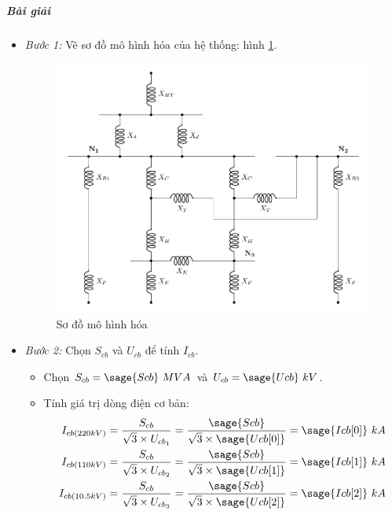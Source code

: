\documentclass[12pt,a4paper]{article}
\newcommand{\unit}[1]{~#1}							%
\begin{document}
\subparagraph{Bài giải}
\begin{itemize}
	\item \textit{Bước 1:} Vẽ sơ đồ mô hình hóa của hệ thống: hình \ref{Fig:sodo-mohinhhoa-bt1}.
		\begin{figure}[!h]
			\begin{center}
				\includegraphics[scale=1]{figure-baitap-nganmach-1-1.pdf} 
			\end{center}
			\caption{Sơ đồ mô hình hóa} \label{Fig:sodo-mohinhhoa-bt1}
		\end{figure}

	\item \textit{Bước 2:} Chọn $S_{cb}$ và $U_{cb}$ để tính $I_{cb}$.	
		\begin{itemize}
			\item Chọn $S_{cb} = \sage{Scb} \unit{MVA}$ và $U_{cb} = \sage{Ucb} \unit{kV}$.
			
			\item Tính giá trị dòng điện cơ bản:
				\begin{equation*}
					\begin{split}
						I_{cb\left({220kV}\right)} & = \dfrac{S_{cb}}{\sqrt{3} \times U_{cb_{1}}} = \dfrac{\sage{Scb}}{\sqrt{3} \times \sage{Ucb[0]}} = \sage{Icb[0]} \unit{kA}\\
						I_{cb\left({110kV}\right)} & = \dfrac{S_{cb}}{\sqrt{3} \times U_{cb_{2}}} = \dfrac{\sage{Scb}}{\sqrt{3} \times \sage{Ucb[1]}} = \sage{Icb[1]} \unit{kA}\\
						I_{cb\left({10.5kV}\right)} & = \dfrac{S_{cb}}{\sqrt{3} \times U_{cb_{3}}} = \dfrac{\sage{Scb}}{\sqrt{3} \times \sage{Ucb[2]}} = \sage{Icb[2]} \unit{kA}
					\end{split}
				\end{equation*}
		\end{itemize}


\end{itemize}
\end{document}
